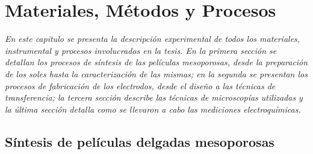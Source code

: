  \newcommand{\NoBiblioMat}[1]{
 \ifthenelse{\equal{#1}{verdadero}}{}{}
 \NoBiblioMat{verdadero}}


 \FormatoCapituloUnaLinea

 \chapter{Materiales, Métodos y Procesos}\label{chap:Materiales}

 \thispagestyle{empty}
	
  \noindent\textit{En este capitulo se presenta la descripción experimental de todos los materiales, instrumental y procesos involucrados en la tesis. En la primera sección se detallan los procesos de síntesis de las películas mesoporosas, desde la preparación de los soles hasta la caracterización de las mismas; en la segunda se presentan los procesos de fabricación de los electrodos, desde el diseño a las técnicas de transferencia; la tercera sección describe las técnicas de microscopías utilizadas y la última sección detalla como se llevaron a cabo las mediciones electroquímicas.}


 \vfill
 \minitoc
 \newpage


\section{Síntesis de películas delgadas mesoporosas}\label{sec:sintesis_mesoporosos}	
	
